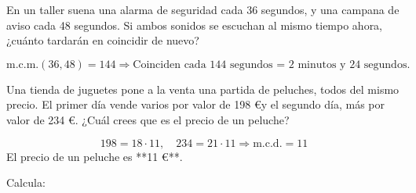 \documentclass[addpoints,spanish, 12pt,a4paper]{exam}
\begin{document}
\begin{questions}

\question[3] En un taller suena una alarma de seguridad cada 36 segundos, y una campana de aviso cada 48 segundos. Si ambos sonidos se escuchan al mismo tiempo ahora, ¿cuánto tardarán en coincidir de nuevo?\vspace{100pt}

\begin{solution}
$$
\text{m.c.m.}(36, 48) = 144 \Rightarrow \text{Coinciden cada } 144 \text{ segundos = 2 minutos y 24 segundos.}
$$
\end{solution}

\question[3] Una tienda de juguetes pone a la venta una partida de peluches, todos del mismo precio. El primer día vende varios por valor de 198 \euro y el segundo día, más por valor de 234 \euro. ¿Cuál crees que es el precio de un peluche?\vspace{100pt}
\begin{solution}
\[
198 = 18 \cdot 11,\quad 234 = 21 \cdot 11 \Rightarrow \text{m.c.d.} = 11
\]
El precio de un peluche es **11 €**.
\end{solution}


\question Calcula:
\end{questions}
\end{document}
